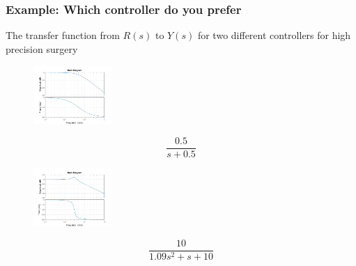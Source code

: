 \begin{frame}
	\frametitle{Example: Which controller do you prefer}
	The transfer function from $R(s)$ to $Y(s)$ for two different controllers for high precision surgery\\
	\begin{minipage}{0.7\linewidth}
	\begin{figure}
\centering
\includegraphics[width=\columnwidth,height=6em]{smooth-bode}
\label{fig:smooth-bode}
\end{figure}
\end{minipage}
\hfill
\begin{minipage}{0.2\linewidth}
	\[\frac{0.5}{s+0.5}\]
\end{minipage}
\vspace*{-3em}
\begin{minipage}{0.7\linewidth}
\begin{figure}
\centering
\includegraphics[width=\columnwidth,height=6em]{osc-bode}
\label{fig:osc-bode}
\end{figure}
\end{minipage}
\hfill
\begin{minipage}{0.2\linewidth}
	\[\frac{10}{1.09s^2 + s + 10}\]
\end{minipage}
\end{frame}


